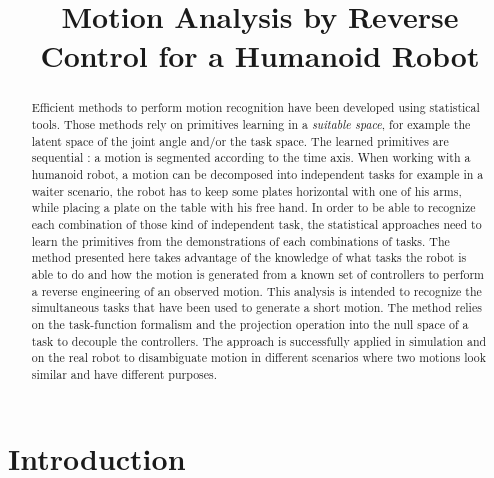 \documentclass[letterpaper, 10pt, conference]{ieeeconf}      %
\title{\LARGE \bf
Motion Analysis by Reverse Control for a Humanoid Robot
}
\begin{document}
\maketitle
\thispagestyle{empty}
\pagestyle{empty}


\begin{abstract}
Efficient methods to perform motion recognition have been developed
using statistical tools. Those methods rely on primitives learning
in a \emph{suitable space}, for example the latent space of the joint angle and/or the task space.
The learned primitives are sequential : a motion is segmented according to the time axis.
When working with a humanoid robot, a motion can be decomposed into
independent tasks for example in a waiter scenario,
the robot has to keep some plates horizontal with one of his arms, while placing a plate
on the table with his free hand.
In order to be able to recognize each combination of those kind of independent task,
the statistical approaches need to learn the primitives from the demonstrations of each
combinations of tasks.
The method presented here
takes advantage of the knowledge of what tasks the robot is able to do and how
the motion is generated from a known set of controllers to perform a reverse engineering of an
observed motion. This analysis is intended to recognize the simultaneous tasks that
have been used to generate a short motion. The method relies
on the task-function formalism and the projection operation into the null space of a task to decouple
the controllers.
The approach is successfully applied in simulation and on the real robot
to disambiguate motion in different scenarios where two motions look similar and have
different purposes.
\end{abstract}

\section{Introduction}
\end{document}
